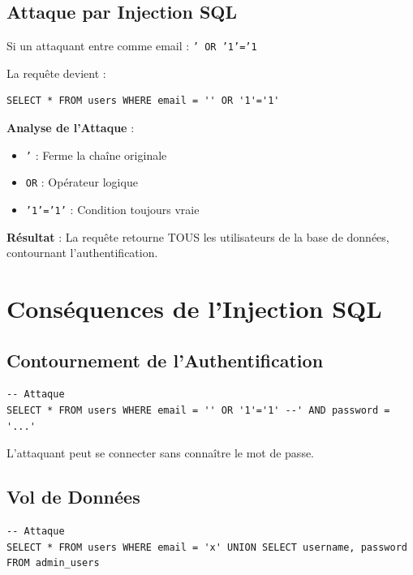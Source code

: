 \subsection{Attaque par Injection SQL}

Si un attaquant entre comme email :
\texttt{' OR '1'='1}

La requête devient :
\begin{lstlisting}[style=sql]
SELECT * FROM users WHERE email = '' OR '1'='1'
\end{lstlisting}

\begin{definitionbox}
    \textbf{Analyse de l'Attaque} :
    \begin{itemize}
        \item \texttt{'} : Ferme la chaîne originale
        \item \texttt{OR} : Opérateur logique
        \item \texttt{'1'='1'} : Condition toujours vraie
    \end{itemize}
\end{definitionbox}

\textbf{Résultat} : La requête retourne TOUS les utilisateurs de la base de données, contournant l'authentification.

\section{Conséquences de l'Injection SQL}

\subsection{Contournement de l'Authentification}

\begin{lstlisting}[style=sql]
-- Attaque
SELECT * FROM users WHERE email = '' OR '1'='1' --' AND password = '...'
\end{lstlisting}

L'attaquant peut se connecter sans connaître le mot de passe.

\subsection{Vol de Données}

\begin{lstlisting}[style=sql]
-- Attaque
SELECT * FROM users WHERE email = 'x' UNION SELECT username, password FROM admin_users
\end{lstlisting}

